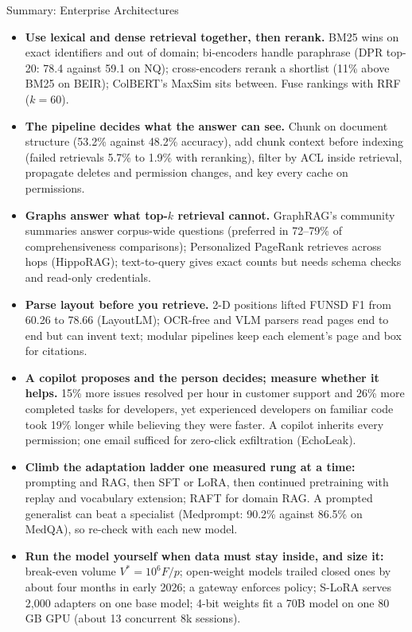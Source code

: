 \begin{frame}{Summary: Enterprise Architectures}
  \begin{itemize}\scriptsize\setlength{\itemsep}{0.4em}\setlength{\parsep}{0pt}\setlength{\parskip}{0pt}
    \item[\textcolor{red}{$\blacktriangleright$}] \textbf{Use lexical and dense retrieval together, then rerank.} BM25 wins on exact identifiers and out of domain; bi-encoders handle paraphrase (DPR top-20: 78.4 against 59.1 on NQ); cross-encoders rerank a shortlist (11\% above BM25 on BEIR); ColBERT's MaxSim sits between. Fuse rankings with RRF ($k = 60$).
    \item[\textcolor{red}{$\blacktriangleright$}] \textbf{The pipeline decides what the answer can see.} Chunk on document structure (53.2\% against 48.2\% accuracy), add chunk context before indexing (failed retrievals 5.7\% to 1.9\% with reranking), filter by ACL inside retrieval, propagate deletes and permission changes, and key every cache on permissions.
    \item[\textcolor{red}{$\blacktriangleright$}] \textbf{Graphs answer what top-$k$ retrieval cannot.} GraphRAG's community summaries answer corpus-wide questions (preferred in 72--79\% of comprehensiveness comparisons); Personalized PageRank retrieves across hops (HippoRAG); text-to-query gives exact counts but needs schema checks and read-only credentials.
    \item[\textcolor{red}{$\blacktriangleright$}] \textbf{Parse layout before you retrieve.} 2-D positions lifted FUNSD F1 from 60.26 to 78.66 (LayoutLM); OCR-free and VLM parsers read pages end to end but can invent text; modular pipelines keep each element's page and box for citations.
    \item[\textcolor{red}{$\blacktriangleright$}] \textbf{A copilot proposes and the person decides; measure whether it helps.} 15\% more issues resolved per hour in customer support and 26\% more completed tasks for developers, yet experienced developers on familiar code took 19\% longer while believing they were faster. A copilot inherits every permission; one email sufficed for zero-click exfiltration (EchoLeak).
    \item[\textcolor{red}{$\blacktriangleright$}] \textbf{Climb the adaptation ladder one measured rung at a time:} prompting and RAG, then SFT or LoRA, then continued pretraining with replay and vocabulary extension; RAFT for domain RAG. A prompted generalist can beat a specialist (Medprompt: 90.2\% against 86.5\% on MedQA), so re-check with each new model.
    \item[\textcolor{red}{$\blacktriangleright$}] \textbf{Run the model yourself when data must stay inside, and size it:} break-even volume $V^{*} = 10^6 F / p$; open-weight models trailed closed ones by about four months in early 2026; a gateway enforces policy; S-LoRA serves 2,000 adapters on one base model; 4-bit weights fit a 70B model on one 80\,GB GPU (about 13 concurrent 8k sessions).
  \end{itemize}
\end{frame}
